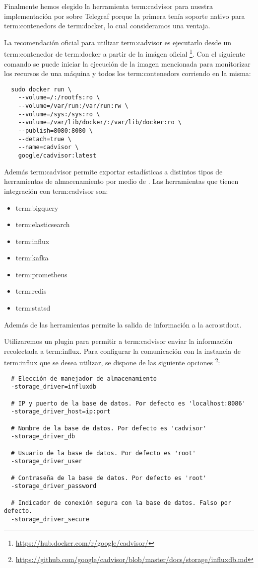 Finalmente hemos elegido la herramienta \gls{term:cadvisor} para nuestra
implementación por sobre Telegraf porque la primera tenía soporte nativo para
\glspl{term:contenedor} de \gls{term:docker}, lo cual consideramos una ventaja.

La recomendación oficial para utilizar \gls{term:cadvisor} es ejecutarlo desde
un \gls{term:contenedor} de \gls{term:docker} a partir de la imágen oficial
\footnote{\url{https://hub.docker.com/r/google/cadvisor/}}. Con el siguiente
comando se puede iniciar la ejecución de la imagen mencionada para monitorizar
los recursos de una máquina y todos los \glspl{term:contenedor} corriendo en la
misma:

\begin{lstlisting}
  sudo docker run \
    --volume=/:/rootfs:ro \
    --volume=/var/run:/var/run:rw \
    --volume=/sys:/sys:ro \
    --volume=/var/lib/docker/:/var/lib/docker:ro \
    --publish=8080:8080 \
    --detach=true \
    --name=cadvisor \
    google/cadvisor:latest
\end{lstlisting}


Además \gls{term:cadvisor} permite exportar estadísticas a distintos tipos de
herramientas de almacenamiento por medio de . Las herramientas que
tienen integración con \gls{term:cadvisor} son:

\begin{itemize}
  \item \gls{term:bigquery}
  \item \gls{term:elasticsearch}
  \item \gls{term:influx}
  \item \gls{term:kafka}
  \item \gls{term:prometheus}
  \item \gls{term:redis}
  \item \gls{term:statsd}
\end{itemize}

Además de las herramientas permite la salida de información a la
\gls{acro:stdout}.

Utilizaremos un plugin para permitir a \gls{term:cadvisor} enviar la
información recolectada a \gls{term:influx}. Para configurar la comunicación
con la instancia de \gls{term:influx} que se desea utilizar, se dispone de las
siguiente opciones
\footnote{\url{https://github.com/google/cadvisor/blob/master/docs/storage/influxdb.md}}:

\begin{lstlisting}
  # Elección de manejador de almacenamiento
  -storage_driver=influxdb

  # IP y puerto de la base de datos. Por defecto es 'localhost:8086'
  -storage_driver_host=ip:port

  # Nombre de la base de datos. Por defecto es 'cadvisor'
  -storage_driver_db

  # Usuario de la base de datos. Por defecto es 'root'
  -storage_driver_user

  # Contraseña de la base de datos. Por defecto es 'root'
  -storage_driver_password

  # Indicador de conexión segura con la base de datos. Falso por defecto.
  -storage_driver_secure
\end{lstlisting}

